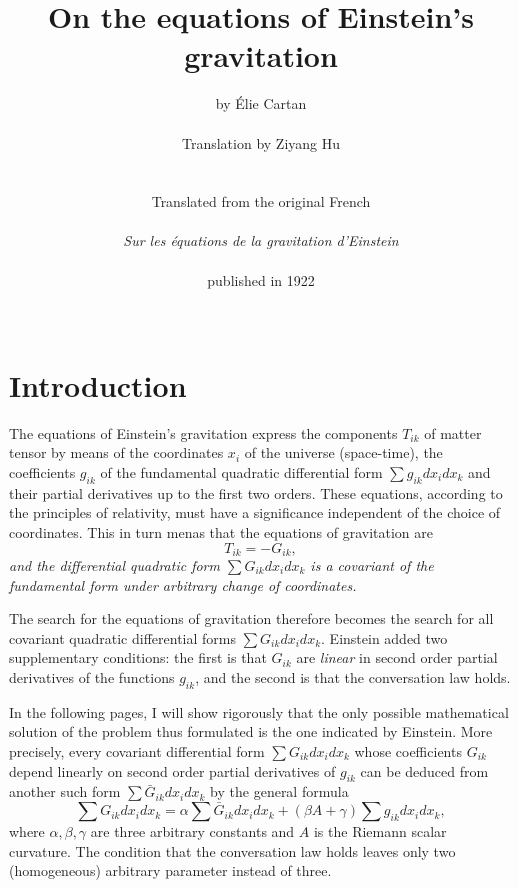 \documentclass[leqno,12pt]{article}
\title{On the equations of Einstein's gravitation}
\author{by Élie Cartan\\
\\
Translation by Ziyang Hu\\
\\
\\
Translated from the original French\\
\\
\emph{Sur les équations de la gravitation d'Einstein}\\ 
\\
published in 1922\\\\}
\theoremstyle{shape1}
\theoremstyle{shape0}
\theoremstyle{shape2}
\theoremstyle{definition}
\begin{document}
\renewcommand{\theequation}{\arabic{equation}}
\renewcommand{\thefootnote}{\fnsymbol{footnote}}

\maketitle

\renewcommand{\qedsymbol}{\textsc{q.e.d.}}
\renewcommand{\thesection}{\roman{section}.}
\renewcommand{\thesubsection}{\Roman{subsection}.}

\tableofcontents
\newpage
\section{Introduction}
\label{sec:introduction}



The equations of Einstein's gravitation express the components $T_{ik}$ of matter tensor by means of the coordinates $x_{i}$ of the universe (space-time), the coefficients $g_{ik}$ of the fundamental quadratic differential form $\sum g_{ik}dx_{i}dx_{k}$ and their partial derivatives up to the first two orders. These equations, according to the principles of relativity, must have a significance independent of the choice of coordinates. This in turn menas that the equations of gravitation are
\[
T_{ik}=-G_{ik},
\]
\emph{and the differential quadratic form $\sum G_{ik}dx_{i}dx_{k}$ is a covariant of the fundamental form under arbitrary change of coordinates.}

The search for the equations of gravitation therefore becomes the search for all covariant quadratic differential forms $\sum G_{ik}dx_{i}dx_{k}$. Einstein added two supplementary conditions: the first is that $G_{ik}$ are \emph{linear} in second order partial derivatives of the functions $g_{ik}$, and the second is that the conversation law holds.

In the following pages, I will show rigorously that the only possible mathematical solution of the problem thus formulated is the one indicated by Einstein. More precisely, every covariant differential form $\sum G_{ik}dx_{i}dx_{k}$ whose coefficients $G_{ik}$ depend linearly on second order partial derivatives of $g_{ik}$ can be deduced from another such form $\sum \bar G_{ik}dx_{i}dx_{k}$  by the general formula
\[
\sum G_{ik}dx_{i}dx_{k}=\alpha\sum\bar G_{ik}dx_{i}dx_{k}+(\beta A+\gamma)\sum g_{ik}dx_{i}dx_{k},
\]
where $\alpha,\beta,\gamma$ are three arbitrary constants and $A$ is the Riemann scalar curvature. The condition that the conversation law holds leaves only two (homogeneous) arbitrary parameter instead of three.
\end{document}
